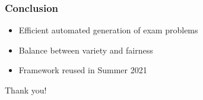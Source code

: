 \documentclass[xcolor={table}]{beamer}
\begin{document}
\begin{frame}
\frametitle{Conclusion}

  \begin{itemize}
    \item Efficient automated generation of exam problems
    \item Balance between variety and fairness
    \item Framework reused in Summer 2021
  \end{itemize}

\bigskip
\pause

\begin{center}
    Thank you!
\end{center}
\end{frame}

\end{document}
